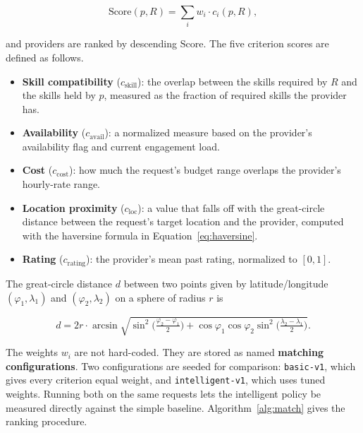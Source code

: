 \begin{equation}
	\text{Score}(p, R) = \sum_{i} w_i \cdot c_i(p, R),
	\label{eq:score}
\end{equation}

and providers are ranked by descending $\text{Score}$. The five criterion scores
are defined as follows.

\begin{itemize}
	\item \textbf{Skill compatibility} ($c_\text{skill}$): the overlap between the
	      skills required by $R$ and the skills held by $p$, measured as the
	      fraction of required skills the provider has.
	\item \textbf{Availability} ($c_\text{avail}$): a normalized measure based on
	      the provider's availability flag and current engagement load.
	\item \textbf{Cost} ($c_\text{cost}$): how much the request's budget range
	      overlaps the provider's hourly-rate range.
	\item \textbf{Location proximity} ($c_\text{loc}$): a value that falls off
	      with the great-circle distance between the request's target location and
	      the provider, computed with the haversine formula in
	      Equation~\ref{eq:haversine}.
	\item \textbf{Rating} ($c_\text{rating}$): the provider's mean past rating,
	      normalized to $[0, 1]$.
\end{itemize}

The great-circle distance $d$ between two points given by latitude/longitude
$(\varphi_1, \lambda_1)$ and $(\varphi_2, \lambda_2)$ on a sphere of radius $r$
is

\begin{equation}
	d = 2r \cdot \arcsin\!\sqrt{\sin^2\!\Big(\tfrac{\varphi_2 - \varphi_1}{2}\Big)
	+ \cos\varphi_1 \cos\varphi_2 \sin^2\!\Big(\tfrac{\lambda_2 - \lambda_1}{2}\Big)}.
	\label{eq:haversine}
\end{equation}

The weights $w_i$ are not hard-coded. They are stored as named \textbf{matching
configurations}. Two configurations are seeded for comparison: \texttt{basic-v1},
which gives every criterion equal weight, and \texttt{intelligent-v1}, which uses
tuned weights. Running both on the same requests lets the intelligent policy be
measured directly against the simple baseline. Algorithm~\ref{alg:match} gives
the ranking procedure.

